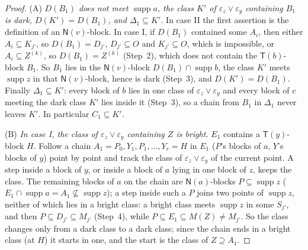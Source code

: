 \documentclass[11pt]{amsart}
\theoremstyle{definition}
\newcommand{\supp}{\operatorname{supp}}
\newcommand{\T}{\mathsf{T}}
\newcommand{\N}{\mathsf{N}}
\begin{document}
\begin{proof}
(A) \emph{$D(B_1)$ does not meet $\supp a$, the class $K'$ of $\varepsilon_z\vee\varepsilon_y$ containing $B_1$ is dark, $D(K')=D(B_1)$, and $\Delta_1\subseteq K'$.} In case II the first assertion is the definition of an $\N(v)$-block. In case I, if $D(B_1)$ contained some $A_i$, then either $A_i\subseteq K_{j'}$, so $D(B_1)=D_{j'}$, $D_{j'}\subseteq O$ and $K_{j'}\subseteq O$, which is impossible, or $A_i\subseteq Z^{(k)}$, so $D(B_1)=Z^{(k)}$ (Step~2), which does not contain the $\T(b)$-block $B_1$. So $B_1$ lies in the $\N(v)$-block $D(B_1)\cap\supp b$, the class $K'$ meets $\supp z$ in that $\N(v)$-block, hence is dark (Step~3), and $D(K')=D(B_1)$. Finally $\Delta_1\subseteq K'$: every block of $b$ lies in one class of $\varepsilon_z\vee\varepsilon_y$ and every block of $c$ meeting the dark class $K'$ lies inside it (Step~3), so a chain from $B_1$ in $\Delta_1$ never leaves $K'$. In particular $C_1\subseteq K'$.

(B) \emph{In case I, the class of $\varepsilon_z\vee\varepsilon_y$ containing $Z$ is bright.} $E_1$ contains a $\T(y)$-block $H$. Follow a chain $A_1=P_0,Y_1,P_1,\dots,Y_r=H$ in $E_1$ ($P$'s blocks of $a$, $Y$'s blocks of $y$) point by point and track the class of $\varepsilon_z\vee\varepsilon_y$ of the current point. A step inside a block of $y$, or inside a block of $a$ lying in one block of $z$, keeps the class. The remaining blocks of $a$ on the chain are $\N(a)$-blocks $P\subseteq\supp z$ ($E_1\cap\supp a=A_1\not\subseteq\supp z$); a step inside such a $P$ joins two points of $\supp z$, neither of which lies in a bright class: a bright class meets $\supp z$ in some $S_{j'}$, and then $P\subseteq D_{j'}\subseteq M_{j'}$ (Step~4), while $P\subseteq E_1\subseteq M(Z)\ne M_{j'}$. So the class changes only from a dark class to a dark class; since the chain ends in a bright class (at $H$) it starts in one, and the start is the class of $Z\supseteq A_1$.


\end{proof}
\end{document}

